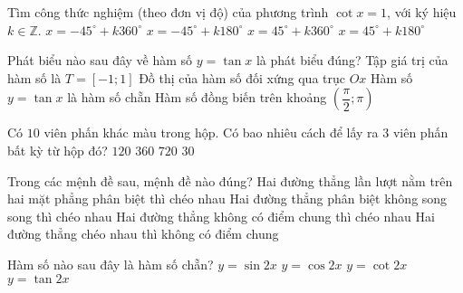 \begin{ex}%
	Tìm công thức nghiệm (theo đơn vị độ) của phương trình $\cot x=1$, với ký hiệu $k \in \mathbb{Z}$.
	\choice
	{$x=-45^{\circ}+k360^{\circ}$}
	{$x=-45^{\circ}+k180^{\circ}$}
	{$x=45^{\circ}+k360^{\circ}$}
	{\True $x=45^{\circ}+k180^{\circ}$}
\end{ex}
\begin{ex}%
	Phát biểu nào sau đây về hàm số $y=\tan x$ là phát biểu đúng?
	\choice
	{Tập giá trị của hàm số là $T=[-1;1]$}
	{Đồ thị của hàm số đối xứng qua trục $Ox$}
	{Hàm số $y=\tan x$ là hàm số chẵn}
	{\True Hàm số đồng biến trên khoảng $\left(\dfrac{\pi}{2};\pi \right)$}
\end{ex}
\begin{ex}%
	Có $10$ viên phấn khác màu trong hộp. Có bao nhiêu cách để lấy ra $3$ viên phấn bất kỳ từ hộp đó?
	\choice
	{\True $120$}
	{$360$}
	{$720$}
	{$30$}
\end{ex}
\begin{ex}%
	Trong các mệnh đề sau, mệnh đề nào đúng?
	\choice
	{Hai đường thẳng lần lượt nằm trên hai mặt phẳng phân biệt thì chéo nhau}
	{Hai đường thẳng phân biệt không song song thì chéo nhau}
	{Hai đường thẳng không có điểm chung thì chéo nhau}
	{\True Hai đường thẳng chéo nhau thì không có điểm chung}
\end{ex}
\begin{ex}%
	Hàm số nào sau đây là hàm số chẵn?
	\choice
	{$y=\sin 2x$}
	{\True $y=\cos 2x$}
	{$y=\cot 2x$}
	{$y=\tan 2x$}
\end{ex}
